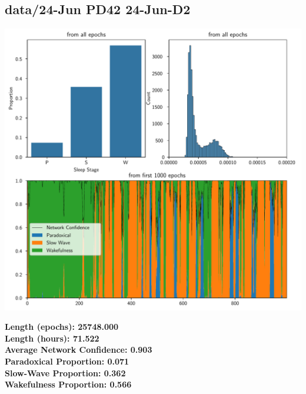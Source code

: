         \subsection*{ data/24-Jun PD42 24-Jun-D2 }
        \begin{center}
        \begin{adjustbox}{width=1\textwidth}
        \includegraphics[page=24]{figs.pdf}
        \end{adjustbox}
        \end{center}
        \large\textbf{Length (epochs): 25748.000}\\
        \textbf{Length (hours): 71.522}\\
        \textbf{Average Network Confidence: 0.903}\\
        \textbf{Paradoxical Proportion: 0.071}\\
        \textbf{Slow-Wave Proportion: 0.362}\\
        \textbf{Wakefulness Proportion: 0.566}\\
        

